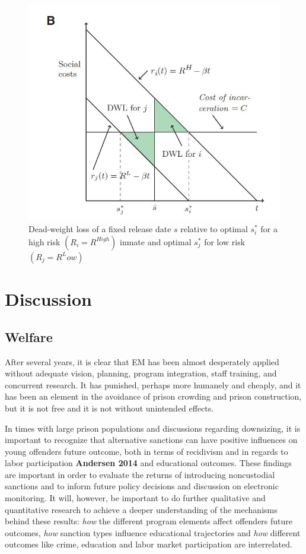 \documentclass[a4paper,12pt]{article}
\begin{document}
\begin{figure}[h]
\centering
\includegraphics[scale=0.60]{fig2.JPG}
\caption{Dead-weight loss of a fixed release date $s$ relative to optimal $s^*_i$ for a high risk $(R_i = R^{High})$ inmate and optimal $s^*_j$ for low risk $(R_j = R^Low)$}
\label{fig:Figure 2}
\end{figure}





\newpage
\section{Discussion}
\subsection{Welfare}
After several years, it is clear that EM has been almost desperately applied without adequate vision, planning, program integration, staff training, and concurrent research. It has punished, perhaps more humanely and cheaply, and it has been an element in the avoidance of prison crowding and prison construction, but it is not free and it is not without unintended effects. 

In times with large prison populations and discussions regarding downsizing, it is important to recognize that alternative sanctions can have positive influences on young offenders future outcome, both in terms of recidivism and in regards to labor participation \textbf{Andersen 2014} \cite{Andersen2014} and educational outcomes. These findings are important in order to evaluate the returns of introducing noncustodial sanctions and to inform future policy decisions and discussion on electronic monitoring. It will, however, be important to do further qualitative and quantitative research to achieve a deeper understanding of the mechanisms behind these results: \textit{how} the different program elements affect offenders future outcomes, \textit{how} sanction types influence educational trajectories and \textit{how} different outcomes like crime, education and labor market participation are interrelated. 
\end{document}
